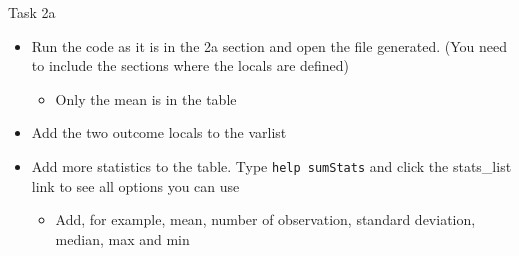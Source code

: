 \documentclass[aspectratio=169]{beamer}
\begin{document}
\begin{frame}{Task 2a}
	\begin{itemize}
		\item Run the code as it is in the 2a section and open the file generated. (You need to include the sections where the locals are defined)
		\begin{itemize}
			\item Only the mean is in the table
		\end{itemize}
		\item Add the two outcome locals to the varlist
		\item Add more statistics to the table. Type \texttt{help sumStats} and click the stats\_list link to see all options you can use
		\begin{itemize}
			\item Add, for example, mean, number of observation, standard deviation, median, max and min
		\end{itemize}
	\end{itemize}
\end{frame}
\end{document}
